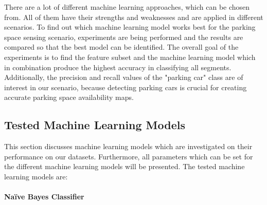 There are a lot of different machine learning approaches, which can be chosen from. All of them have their strengths and weaknesses and are applied in different scenarios. To find out which machine learning model works best for the parking space sensing scenario, experiments are being performed and the results are compared so that the best model can be identified. 
The overall goal of the experiments is to find the feature subset and the machine learning model which in combination produce the highest accuracy in classifying all segments. 
Additionally, the precision and recall values of the "parking car" class are of interest in our scenario, because detecting parking cars is crucial for creating accurate parking space availability maps.





\subsection{Tested Machine Learning Models}
\label{sec:machine_learning_models}

This section discusses machine learning models which are investigated on their performance on our datasets. Furthermore, all parameters which can be set for the different machine learning models will be presented. The tested machine learning models are:


\paragraph{Naïve Bayes Classifier}

